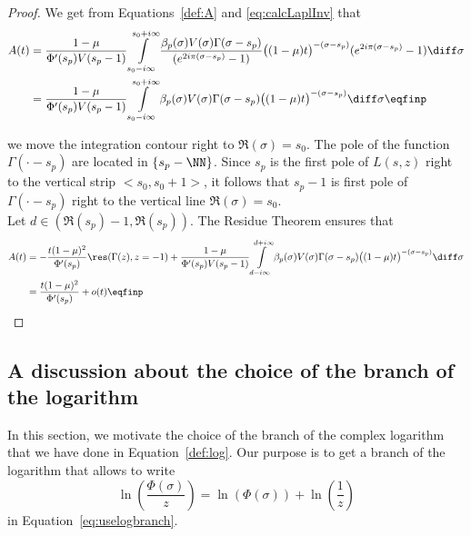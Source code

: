\begin{lemma}
    
\end{lemma}
\begin{proof}We get from Equations~\eqref{def:A} and \eqref{eq:calcLaplInv} that 
\begin{subequations}
    \begin{align}
    A(t) 
    &=
    \frac{1-\mu}{\Phi'(s_p) V(s_p-1)}
     \int\limits_{s_0-i\infty}^{s_0+i\infty}
     \frac{\beta_p(\sigma) V(\sigma)\Gamma(\sigma-s_p)
  }{(e^{2i\pi(\sigma-s_p)}-1)} \big((1-\mu)t\big)^{-(\sigma-s_p)}(e^{2i\pi(\sigma-s_p)}-1) \diff \sigma  \\
  &=  
   \frac{1-\mu}{\Phi'(s_p) V(s_p-1)}
     \int\limits_{s_0-i\infty}^{s_0+i\infty}
     \beta_p(\sigma) V(\sigma)
   \Gamma(\sigma-s_p)\big((1-\mu)t\big)^{-(\sigma-s_p)} \diff \sigma
  \eqfinp
\end{align}
\end{subequations}

we move the integration contour right to $\Re(\sigma) = s_0$. The pole of the function $\Gamma(\cdot-s_p)$ are located in $\{s_p - \NN\}$. Since $s_p$ is the first pole of $L(s,z)$ right to the vertical strip $<s_0, s_0+1>$, it follows that $s_p-1$ is first pole of $\Gamma(\cdot-s_p)$ right to the vertical line $\Re(\sigma) = s_0$. \\

Let $d \in (\Re(s_p)-1,\Re(s_p))$. The Residue Theorem ensures that 
\begin{align*}
    A(t) 
    &=  - \frac{t(1-\mu)^2}{\Phi'(s_p)} \res(\Gamma(z), z = -1) +   \frac{1-\mu}{\Phi'(s_p) V(s_p-1)}
     \int\limits_{d-i\infty}^{d+i\infty}
     \beta_p(\sigma) V(\sigma)
   \Gamma(\sigma-s_p)\big((1-\mu)t\big)^{-(\sigma-s_p)} \diff \sigma \\
   &=  \frac{t(1-\mu)^2}{\Phi'(s_p)} + o(t)
  \eqfinp
\end{align*}
\end{proof}


\subsection{A discussion about the choice of the branch of the logarithm}
In this section, we motivate the choice of the branch of the complex logarithm that we have done in Equation~\eqref{def:log}. Our purpose is to get a branch of the logarithm that allows to write 
    $$ \ln(\frac{\Phi(\sigma)}{z}) = \ln(\Phi(\sigma)) + \ln(\frac{1}{z})$$
in Equation~\eqref{eq:uselogbranch}. \\

